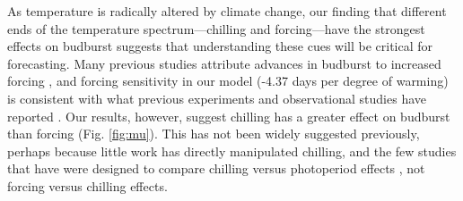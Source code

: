 \documentclass{article}
\begin{document}

\par As temperature is radically altered by climate change, our finding that different ends of the temperature spectrum---chilling and forcing---have the strongest effects on budburst suggests that understanding these cues will be critical for forecasting. Many previous studies attribute advances in budburst to increased forcing \citep{Basler:2014aa,bradley1999,menzel2006,harrington2015}, and forcing sensitivity in our model (-4.37 days per degree of warming) is consistent with what previous experiments and observational studies have reported \citep{Wolkovich:2012n,menzel2006}. Our results, however, suggest chilling has a greater effect on budburst than forcing (Fig. \ref{fig:mu}). This has not been widely suggested previously, perhaps because little work has directly manipulated chilling, and the few studies that have were designed to compare chilling versus photoperiod effects \citep[e.g., ][]{Basler:2014aa,Caffarra:2011qf,Laube:2014a,zohner2016}, not forcing versus chilling effects. 
\end{document}
